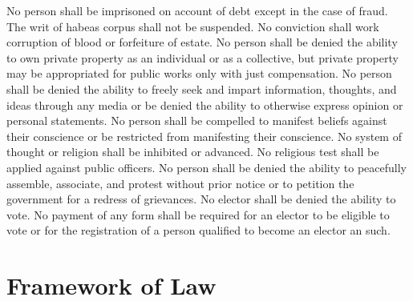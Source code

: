 \documentclass{article}
\begin{document}
No person shall be imprisoned on account of debt except in the case of fraud.
The writ of habeas corpus shall not be suspended. No conviction shall work corruption of blood or forfeiture of estate.
No person shall be denied the ability to own private property as an individual or as a collective, but private property may be appropriated for public works only with just compensation.
No person shall be denied the ability to freely seek and impart information, thoughts, and ideas through any media or be denied the ability to otherwise express opinion or personal statements. 
No person shall be compelled to manifest beliefs against their conscience or be restricted from manifesting their conscience. 
No system of thought or religion shall be inhibited or advanced. No religious test shall be applied against public officers.
No person shall be denied the ability to peacefully assemble, associate, and protest without prior notice or to petition the government for a redress of grievances.
No elector shall be denied the ability to vote. No payment of any form shall be required for an elector to be eligible to vote or for the registration of a person qualified to become an elector an such.
\newpage
\section{Framework of Law}
\end{document}
